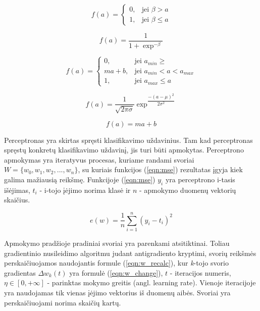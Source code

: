 \begin{equation}
	\label{eqn:unitStep}
	f(a) =
	\begin{cases}
		0, & \mbox{jei } \beta > a \\
		1, & \mbox{jei } \beta \leq a
	\end{cases}
\end{equation}

\begin{equation}
	\label{eqn:sigmoid}
	f(a) = \dfrac{1}{1 + \exp^{-\beta }}
\end{equation}

\begin{equation}
	\label{eqn:pieceLinear}
	f(a) =
	\begin{cases}
		0, & \mbox{jei } a_{min} \geq  \\
		ma + b, & \mbox{jei } a_{min} < a < a_{max} \\
		1, & \mbox{jei } a_{max} \leq a
	\end{cases}
\end{equation}

\begin{equation}
	\label{eqn:gaussian}
	f(a) = \dfrac{1}{\sqrt{2\pi\sigma}} \exp^{\dfrac{-(a - \mu)^2}{2\sigma^2}}
\end{equation}

\begin{equation}
	\label{eqn:linear}
	f(a) = ma + b
\end{equation}

Perceptronas yra skirtas spręsti klasifikavimo uždavinius. Tam kad perceptronas spręstų konkretų klasifikavimo uždavinį, jis turi būti apmokytas. Perceptrono apmokymas yra iteratyvus procesas, kuriame randami svoriai $W = \{w_{0}, w_{1}, w_{2}, ..., w_{n}\}$, su kuriais funkcijos (\ref{eqn:mse}) rezultatas įgyja kiek galima mažiausią reikšmę. Funkcijoje (\ref{eqn:mse}) $y_i$ yra perceptrono i-tasis išėjimas, $t_i$ - i-tojo įėjimo norima klasė ir $n$ - apmokymo duomenų vektorių skaičius.

\begin{equation}
	\label{eqn:mse}
	e(w) = \dfrac{1}{n}\sum_{i=1}^{n}(y_i - t_i)^2
\end{equation}

Apmokymo pradžioje pradiniai svoriai yra parenkami atsitiktinai. Toliau gradientinio nusileidimo algoritmu judant antigradiento kryptimi, svorių reikšmės perskaičiuojamos naudojantis formule (\ref{eqn:w_recalc}), kur \textit{k}-tojo svorio gradientas $\Delta w_k(t)$ yra formulė (\ref{eqn:w_change}), $t$ - iteracijos numeris, $\eta \in [0, +\infty]$ - parinktas mokymo greitis (angl. learning rate). Vienoje iteracijoje yra naudojamas tik vienas įėjimo vektorius iš duomenų aibės. Svoriai yra perskaičiuojami norima skaičių kartų.

